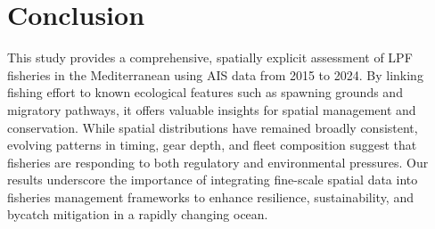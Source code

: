 \chapter{Conclusion}

This study provides a comprehensive, spatially explicit assessment of LPF fisheries in the
Mediterranean using AIS data from 2015 to 2024. By linking fishing effort to known ecological
features such as spawning grounds and migratory pathways, it offers valuable insights for spatial
management and conservation. While spatial distributions have remained broadly consistent, evolving
patterns in timing, gear depth, and fleet composition suggest that fisheries are responding to both
regulatory and environmental pressures. Our results underscore the importance of integrating
fine-scale spatial data into fisheries management frameworks to enhance resilience, sustainability,
and bycatch mitigation in a rapidly changing ocean.